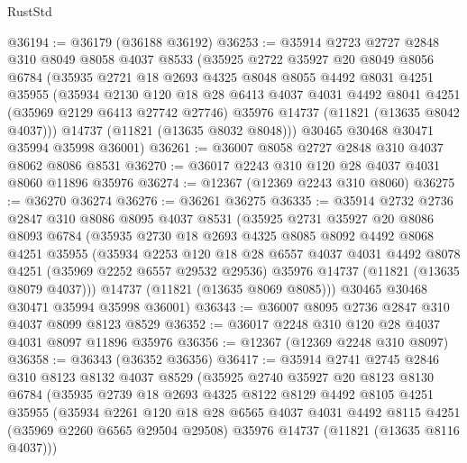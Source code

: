 \begin{lexlean}{RustStd}
\begin{coremodule}
@36194 := @36179 (@36188 @36192)
@36253 := @35914
    @2723
    @2727
    @2848
    @310
    @8049
    @8058
    @4037
    @8533
    (@35925
      @2722
      @35927
      @20
      @8049
      @8056
      @6784
      (@35935
        @2721
        @18
        @2693
        @4325
        @8048
        @8055
        @4492
        @8031
        @4251
        @35955
        (@35934
          @2130
          @120
          @18
          @28
          @6413
          @4037
          @4031
          @4492
          @8041
          @4251
          (@35969 @2129 @6413 @27742 @27746)
          @35976
          @14737
          (@11821 (@13635 @8042 @4037)))
        @14737
        (@11821 (@13635 @8032 @8048)))
      @30465
      @30468
      @30471
      @35994
      @35998
      @36001)
@36261 := @36007 @8058 @2727 @2848 @310 @4037 @8062 @8086 @8531
@36270 := @36017 @2243 @310 @120 @28 @4037 @4031 @8060 @11896 @35976
@36274 := @12367 (@12369 @2243 @310 @8060)
@36275 := @36270 @36274
@36276 := @36261 @36275
@36335 := @35914
    @2732
    @2736
    @2847
    @310
    @8086
    @8095
    @4037
    @8531
    (@35925
      @2731
      @35927
      @20
      @8086
      @8093
      @6784
      (@35935
        @2730
        @18
        @2693
        @4325
        @8085
        @8092
        @4492
        @8068
        @4251
        @35955
        (@35934
          @2253
          @120
          @18
          @28
          @6557
          @4037
          @4031
          @4492
          @8078
          @4251
          (@35969 @2252 @6557 @29532 @29536)
          @35976
          @14737
          (@11821 (@13635 @8079 @4037)))
        @14737
        (@11821 (@13635 @8069 @8085)))
      @30465
      @30468
      @30471
      @35994
      @35998
      @36001)
@36343 := @36007 @8095 @2736 @2847 @310 @4037 @8099 @8123 @8529
@36352 := @36017 @2248 @310 @120 @28 @4037 @4031 @8097 @11896 @35976
@36356 := @12367 (@12369 @2248 @310 @8097)
@36358 := @36343 (@36352 @36356)
@36417 := @35914
    @2741
    @2745
    @2846
    @310
    @8123
    @8132
    @4037
    @8529
    (@35925
      @2740
      @35927
      @20
      @8123
      @8130
      @6784
      (@35935
        @2739
        @18
        @2693
        @4325
        @8122
        @8129
        @4492
        @8105
        @4251
        @35955
        (@35934
          @2261
          @120
          @18
          @28
          @6565
          @4037
          @4031
          @4492
          @8115
          @4251
          (@35969 @2260 @6565 @29504 @29508)
          @35976
          @14737
          (@11821 (@13635 @8116 @4037)))

\end{coremodule}
\end{lexlean}
